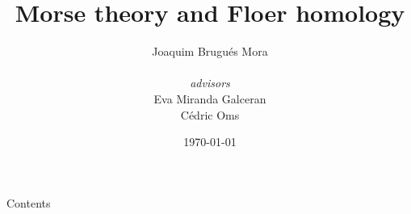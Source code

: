 \documentclass{beamer}
\title{Morse theory and Floer homology}
\author{Joaquim Brugués Mora \\ \ \\ {\it advisors } \\ Eva Miranda Galceran \\ Cédric Oms}
\institute{Facultat de Matemàtiques i Estadística\\ UPC}
\date{\today}
\begin{document}
\begin{frame}
	\titlepage
\end{frame}

\begin{frame}{Contents}
	\tableofcontents
\end{frame}
\end{document}
